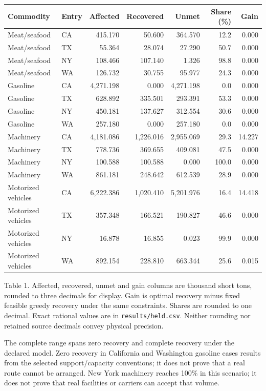 \documentclass[11pt]{article}
\begin{document}
\begin{center}\small
\setlength{\tabcolsep}{3.3pt}
\begin{tabular}{llrrrrr}\toprule
Commodity & Entry & Affected & Recovered & Unmet & Share (\%) & Gain\\\midrule
Meat/seafood & CA & 415.170 & 50.600 & 364.570 & 12.2 & 0.000 \\
Meat/seafood & TX & 55.364 & 28.074 & 27.290 & 50.7 & 0.000 \\
Meat/seafood & NY & 108.466 & 107.140 & 1.326 & 98.8 & 0.000 \\
Meat/seafood & WA & 126.732 & 30.755 & 95.977 & 24.3 & 0.000 \\
Gasoline & CA & 4,271.198 & 0.000 & 4,271.198 & 0.0 & 0.000 \\
Gasoline & TX & 628.892 & 335.501 & 293.391 & 53.3 & 0.000 \\
Gasoline & NY & 450.181 & 137.627 & 312.554 & 30.6 & 0.000 \\
Gasoline & WA & 257.180 & 0.000 & 257.180 & 0.0 & 0.000 \\
Machinery & CA & 4,181.086 & 1,226.016 & 2,955.069 & 29.3 & 14.227 \\
Machinery & TX & 778.736 & 369.655 & 409.081 & 47.5 & 0.000 \\
Machinery & NY & 100.588 & 100.588 & 0.000 & 100.0 & 0.000 \\
Machinery & WA & 861.181 & 248.642 & 612.539 & 28.9 & 0.000 \\
Motorized vehicles & CA & 6,222.386 & 1,020.410 & 5,201.976 & 16.4 & 14.418 \\
Motorized vehicles & TX & 357.348 & 166.521 & 190.827 & 46.6 & 0.000 \\
Motorized vehicles & NY & 16.878 & 16.855 & 0.023 & 99.9 & 0.000 \\
Motorized vehicles & WA & 892.154 & 228.810 & 663.344 & 25.6 & 0.015 \\
\bottomrule\end{tabular}\end{center}
\small Table 1. Affected, recovered, unmet and gain columns are thousand short tons, rounded to three decimals for display. Gain is optimal recovery minus fixed feasible greedy recovery under the same constraints. Shares are rounded to one decimal. Exact rational values are in \texttt{results/held.csv}. Neither rounding nor retained source decimals convey physical precision.\normalsize

The complete range spans zero recovery and complete recovery under the declared model. Zero recovery in California and Washington gasoline cases results from the selected support/capacity conventions; it does not prove that a real route cannot be arranged. New York machinery reaches 100\% in this scenario; it does not prove that real facilities or carriers can accept that volume.
\end{document}
